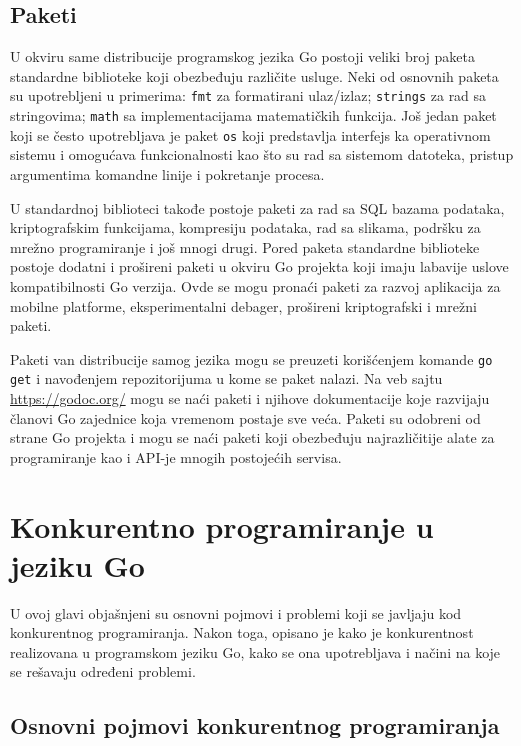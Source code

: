\documentclass[12pt,oneside]{memoir}
\begin{document}
\section{Paketi}

U okviru same distribucije programskog jezika Go postoji veliki broj paketa standardne biblioteke koji obezbeđuju različite usluge. Neki od osnovnih paketa su upotrebljeni u primerima: \texttt{fmt} za formatirani ulaz/izlaz; \texttt{strings} za rad sa stringovima; \texttt{math} sa implementacijama matematičkih funkcija. Još jedan paket koji se često upotrebljava je paket \texttt{os} koji predstavlja interfejs ka operativnom sistemu i omogućava funkcionalnosti kao što su rad sa sistemom datoteka, pristup argumentima komandne linije i pokretanje procesa.

U standardnoj biblioteci takođe postoje paketi za rad sa SQL bazama podataka, kriptografskim funkcijama, kompresiju podataka, rad sa slikama,  podršku za mrežno programiranje i još mnogi drugi. Pored paketa standardne biblioteke postoje dodatni i prošireni paketi u okviru Go projekta koji imaju labavije uslove kompatibilnosti Go verzija. Ovde se mogu pronaći paketi za razvoj aplikacija za mobilne platforme, eksperimentalni debager, prošireni kriptografski i mrežni paketi. 

Paketi van distribucije samog jezika mogu se preuzeti korišćenjem komande \texttt{go get} i navođenjem repozitorijuma u kome se paket nalazi. Na veb sajtu \url{https://godoc.org/} mogu se naći paketi i njihove dokumentacije koje razvijaju članovi Go zajednice koja vremenom postaje sve veća. Paketi su odobreni od strane Go projekta i mogu se naći paketi koji obezbeđuju najrazličitije alate za programiranje kao i API-je mnogih postojećih servisa.


\chapter{Konkurentno programiranje u jeziku Go} \label{conc}

U ovoj glavi objašnjeni su osnovni pojmovi i problemi koji se javljaju kod konkurentnog programiranja. Nakon toga, opisano je kako je konkurentnost realizovana u programskom jeziku Go, kako se ona upotrebljava i načini na koje se rešavaju određeni problemi. 

\section{Osnovni pojmovi konkurentnog programiranja}
\end{document}
